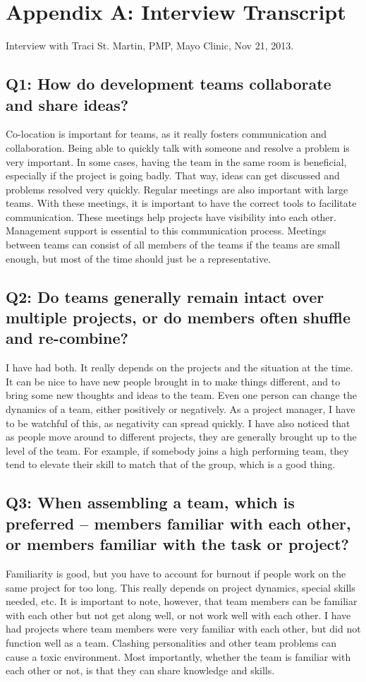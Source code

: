 \clearpage

\section*{Appendix A: Interview Transcript}
Interview with Traci St. Martin, PMP\textregistered, Mayo Clinic, Nov 21, 2013.

\subsection*{Q1: How do development teams collaborate and share ideas?}
Co-location is important for teams, as it really fosters communication and collaboration. Being able to quickly talk with someone and resolve a problem is very important. In some cases, having the team in the same room is beneficial, especially if the project is going badly. That way, ideas can get discussed and problems resolved very quickly. Regular meetings are also important with large teams. With these meetings, it is important to have the correct tools to facilitate communication. These meetings help projects have visibility into each other. Management support is essential to this communication process. Meetings between teams can consist of all members of the teams if the teams are small enough, but most of the time should just be a representative.

\subsection*{Q2: Do teams generally remain intact over multiple projects, or do members often shuffle and re-combine?}
I have had both. It really depends on the projects and the situation at the time. It can be nice to have new people brought in to make things different, and to bring some new thoughts and ideas to the team. Even one person can change the dynamics of a team, either positively or negatively. As a project manager, I have to be watchful of this, as negativity can spread quickly. I have also noticed that as people move around to different projects, they are generally brought up to the level of the team. For example, if somebody joins a high performing team, they tend to elevate their skill to match that of the group, which is a good thing.

\subsection*{Q3: When assembling a team, which is preferred -- members familiar with each other, or members familiar with the task or project?}
Familiarity is good, but you have to account for burnout if people work on the same project for too long. This really depends on project dynamics, special skills needed, etc. It is important to note, however, that team members can be familiar with each other but not get along well, or not work well with each other. I have had projects where team members were very familiar with each other, but did not function well as a team. Clashing personalities and other team problems can cause a toxic environment. Most importantly, whether the team is familiar with each other or not, is that they can share knowledge and skills.

